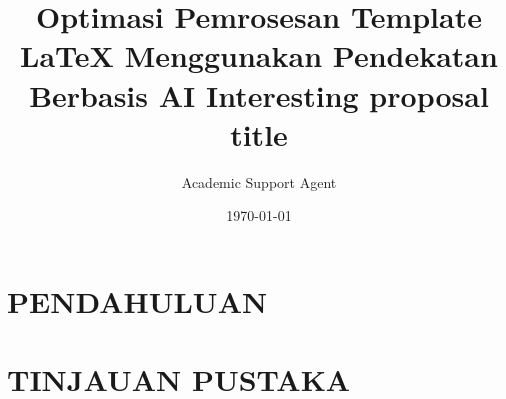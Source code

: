 \documentclass{style}
\title{Optimasi Pemrosesan Template LaTeX Menggunakan Pendekatan Berbasis AI}
\author{Academic Support Agent}
\date{\today}
\begin{document}
\maketitle

\begin{abstract}

\end{abstract}

\chapter{PENDAHULUAN}


\chapter{TINJAUAN PUSTAKA}



\title{\Large \bf
Interesting proposal title %
}
\end{document}
